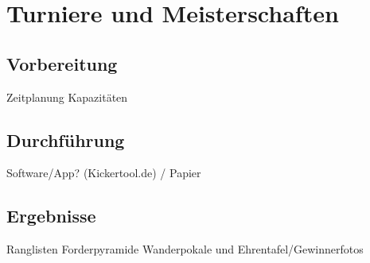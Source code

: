 \chapter{Turniere und Meisterschaften}
\label{turniere}

\section{Vorbereitung}
Zeitplanung
Kapazitäten

\section{Durchführung}
Software/App? (Kickertool.de) / Papier

\section{Ergebnisse}
Ranglisten
Forderpyramide
Wanderpokale und Ehrentafel/Gewinnerfotos

